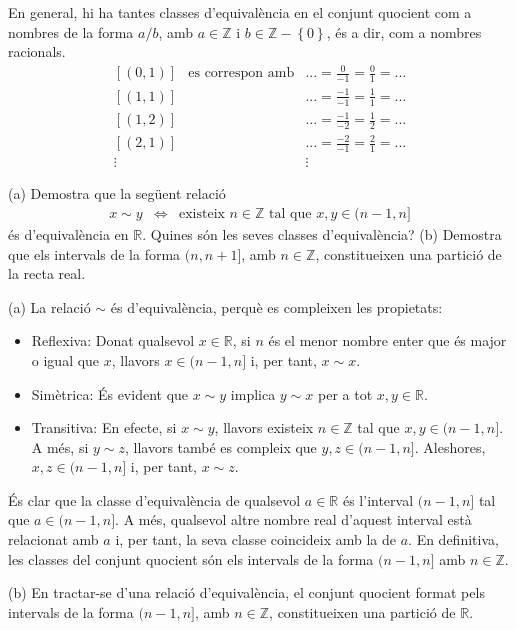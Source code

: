 \begin{solucio}
En general, hi ha tantes classes d'equivalència en el conjunt quocient
com a nombres de la forma $a/b$, amb $a\in \mathbb{Z}$ i $b\in \mathbb{Z}%
-\left\{ 0\right\} $, és a dir, com a nombres racionals.%
\begin{equation*}
\begin{array}{ccc}
\left[ (0,1)\right] & \text{es correspon amb} & ...=\frac{0}{-1}=\frac{0}{1}%
=... \\
\left[ (1,1)\right] &  & ...=\frac{-1}{-1}=\frac{1}{1}=... \\
\left[ (1,2)\right] &  & ...=\frac{-1}{-2}=\frac{1}{2}=... \\
\left[ (2,1)\right] &  & ...=\frac{-2}{-1}=\frac{2}{1}=... \\
\vdots &  & \vdots%
\end{array}%
\end{equation*}
\end{solucio}

\begin{exercici}
(a) Demostra que la següent relació%
\begin{equation*}
\begin{array}{ccc}
x\sim y & \Longleftrightarrow & \text{existeix }n\in \mathbb{Z}\text{ \ tal
que }x,y\in (n-1,n]%
\end{array}%
\end{equation*}%
és d'equivalència en $\mathbb{R}$. Quines són les seves classes
d'equivalència? (b) Demostra que els intervals de la forma $(n,n+1]$,
amb $n\in \mathbb{Z}$, constitueixen una partició de la recta real.
\end{exercici}

\begin{solucio}
(a) La relació $\sim $ és d'equivalència, perquè es
compleixen les propietats:

\begin{itemize}
\item Reflexiva: Donat qualsevol $x\in \mathbb{R}$, si $n$ és el menor
nombre enter que és major o igual que $x$, llavors $x\in (n-1,n]$ i, per
tant, $x\sim x$.

\item Simètrica: És evident que $x\sim y$ implica $y\sim x$ per a
tot $x,y\in \mathbb{R}$.

\item Transitiva: En efecte, si $x\sim y$, llavors existeix $n\in \mathbb{Z}$
tal que $x,y\in (n-1,n]$. A més, si $y\sim z$, llavors també es
compleix que $y,z\in (n-1,n]$. Aleshores, $x,z\in (n-1,n]$ i, per tant, $%
x\sim z$.
\end{itemize}

És clar que la classe d'equivalència de qualsevol $a\in \mathbb{R}$
és l'interval $(n-1,n]$ tal que $a\in (n-1,n]$. A més, qualsevol
altre nombre real d'aquest interval està relacionat amb $a$ i, per tant,
la seva classe coincideix amb la de $a$. En definitiva, les classes del
conjunt quocient són els intervals de la forma $(n-1,n]$ amb $n\in
\mathbb{Z}$.

(b) En tractar-se d'una relació d'equivalència, el conjunt quocient
format pels intervals de la forma $(n-1,n]$, amb $n\in \mathbb{Z}$,
constitueixen una partició de $\mathbb{R}$.
\end{solucio}

